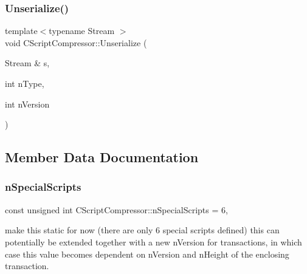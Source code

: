 \mbox{\label{class_c_script_compressor_a016fa6e3d2735d95fcf773271da073d5}} 
\subsubsection{\texorpdfstring{Unserialize()}{Unserialize()}}
{\footnotesize\ttfamily template$<$typename Stream $>$ \\
void C\+Script\+Compressor\+::\+Unserialize (\begin{DoxyParamCaption}\item[{Stream \&}]{s,  }\item[{int}]{n\+Type,  }\item[{int}]{n\+Version }\end{DoxyParamCaption})\hspace{0.3cm}{\ttfamily [inline]}}



\subsection{Member Data Documentation}
\mbox{\label{class_c_script_compressor_a3f0dc2a613a667745ee24a476ce21337}} 
\subsubsection{\texorpdfstring{n\+Special\+Scripts}{nSpecialScripts}}
{\footnotesize\ttfamily const unsigned int C\+Script\+Compressor\+::n\+Special\+Scripts = 6\hspace{0.3cm}{\ttfamily [static]}, {\ttfamily [private]}}

make this static for now (there are only 6 special scripts defined) this can potentially be extended together with a new n\+Version for transactions, in which case this value becomes dependent on n\+Version and n\+Height of the enclosing transaction. \mbox{\label{class_c_script_compressor_afb1c3fb4b9ff4870501705c030cef056}} 
